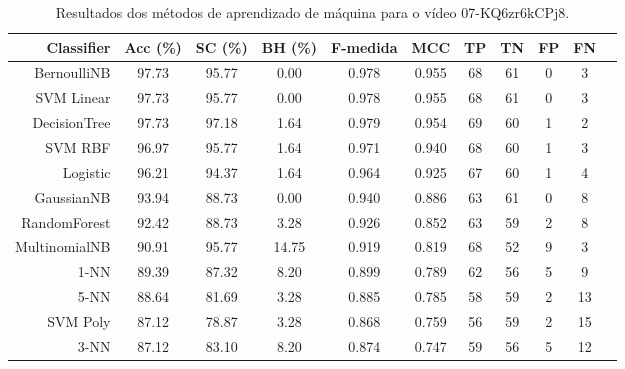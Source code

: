 \begin{table}[!htb]
\centering
\caption{Resultados dos métodos de aprendizado de máquina para o vídeo 07-KQ6zr6kCPj8.}
\label{tab:07-KQ6zr6kCPj8}
\begin{tabular}{r|c|c|c|c|c|c|c|c|c|c}
\hline\hline
Classifier & Acc (\%) & SC (\%) & BH (\%) & F-medida & MCC & TP & TN & FP & FN \\ \hline
BernoulliNB & 97.73 & 95.77 & 0.00 & 0.978 & 0.955 & 68 & 61 & 0 & 3 \\ 
SVM Linear & 97.73 & 95.77 & 0.00 & 0.978 & 0.955 & 68 & 61 & 0 & 3 \\ 
DecisionTree & 97.73 & 97.18 & 1.64 & 0.979 & 0.954 & 69 & 60 & 1 & 2 \\ 
SVM RBF & 96.97 & 95.77 & 1.64 & 0.971 & 0.940 & 68 & 60 & 1 & 3 \\ 
Logistic & 96.21 & 94.37 & 1.64 & 0.964 & 0.925 & 67 & 60 & 1 & 4 \\ 
GaussianNB & 93.94 & 88.73 & 0.00 & 0.940 & 0.886 & 63 & 61 & 0 & 8 \\ 
RandomForest & 92.42 & 88.73 & 3.28 & 0.926 & 0.852 & 63 & 59 & 2 & 8 \\ 
MultinomialNB & 90.91 & 95.77 & 14.75 & 0.919 & 0.819 & 68 & 52 & 9 & 3 \\ 
1-NN & 89.39 & 87.32 & 8.20 & 0.899 & 0.789 & 62 & 56 & 5 & 9 \\ 
5-NN & 88.64 & 81.69 & 3.28 & 0.885 & 0.785 & 58 & 59 & 2 & 13 \\ 
SVM Poly & 87.12 & 78.87 & 3.28 & 0.868 & 0.759 & 56 & 59 & 2 & 15 \\ 
3-NN & 87.12 & 83.10 & 8.20 & 0.874 & 0.747 & 59 & 56 & 5 & 12 \\ 
\hline\hline
\end{tabular}
\end{table}
